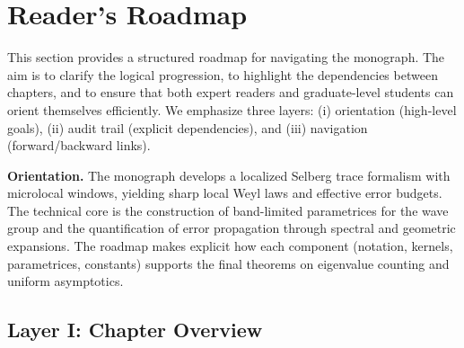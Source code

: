 
\section{Reader’s Roadmap}
\label{sec:readers-roadmap}

This section provides a structured roadmap for navigating the monograph.
The aim is to clarify the logical progression, to highlight the dependencies
between chapters, and to ensure that both expert readers and graduate-level
students can orient themselves efficiently.
We emphasize three layers: (i) orientation (high-level goals), 
(ii) audit trail (explicit dependencies), and 
(iii) navigation (forward/backward links).

\medskip
\noindent\textbf{Orientation.}
The monograph develops a localized Selberg trace formalism with microlocal
windows, yielding sharp local Weyl laws and effective error budgets.
The technical core is the construction of band-limited parametrices for the
wave group and the quantification of error propagation through spectral and
geometric expansions.
The roadmap makes explicit how each component (notation, kernels,
parametrices, constants) supports the final theorems on eigenvalue
counting and uniform asymptotics.

\subsection*{Layer I: Chapter Overview}

